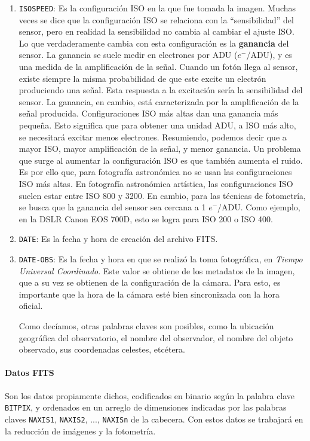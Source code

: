 \documentclass[a4paper, 12pt]{article}
\begin{document}
\begin{enumerate}
\item {\tt ISOSPEED}: Es la configuración ISO en la que fue tomada la imagen. Muchas veces se dice que la configuración ISO se relaciona con la ``sensibilidad'' del sensor, pero en realidad la sensibilidad no cambia al cambiar el ajuste ISO. Lo que verdaderamente cambia con esta configuración es la {\bf ganancia} del sensor. La  ganancia se suele medir en electrones por ADU ($e^{-}$/ADU), y es una medida de la amplificación de la señal.
  Cuando un fotón llega al sensor, existe siempre la misma probabilidad de que este excite un electrón produciendo una señal. Esta respuesta a la excitación sería la sensibilidad del sensor. La ganancia, en cambio, está caracterizada por la amplificación de la señal producida. Configuraciones ISO más altas dan una ganancia más pequeña. Esto significa que para obtener una unidad ADU, a ISO más alto, se necesitará excitar menos electrones. Resumiendo, podemos decir que a mayor ISO, mayor amplificación de la señal, y menor ganancia. Un problema que surge al aumentar la configuración ISO es que también aumenta el ruido. Es por ello que, para fotografía astronómica no se usan las configuraciones ISO más altas. En fotografía astronómica artística, las configuraciones ISO suelen estar entre ISO 800 y 3200. En cambio, para las técnicas de fotometría, se busca que la ganancia del sensor sea cercana a 1 $e^{-}$/ADU. Como ejemplo, en la DSLR {\sf Canon EOS 700D}, esto se logra para ISO 200 o ISO 400. %
\item {\tt DATE}: Es la fecha y hora de creación del archivo FITS.
\item {\tt DATE-OBS}: Es la fecha y hora en que se realizó la toma%
  fotográfica, en {\it Tiempo Universal Coordinado}. Este valor se obtiene de los metadatos de la imagen, que a su vez se obtienen de la configuración de la cámara. Para esto, es importante que la hora de la cámara esté bien sincronizada con la hora oficial.

  Como decíamos, otras palabras claves son posibles, como la ubicación geográfica del observatorio, el nombre del observador, el nombre del objeto observado, sus coordenadas celestes, etcétera.
\end{enumerate}

\paragraph{Datos FITS}
Son los datos propiamente dichos, codificados en binario según la palabra clave {\tt BITPIX}, y ordenados en un arreglo de dimensiones indicadas por las palabras claves {\tt NAXIS1}, {\tt NAXIS2}, ..., {\tt NAXISn} de la cabecera. Con estos datos se trabajará en la reducción de imágenes y la fotometría.
\end{document}
